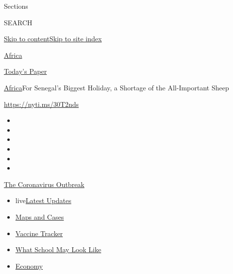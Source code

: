 Sections

SEARCH

\protect\hyperlink{site-content}{Skip to
content}\protect\hyperlink{site-index}{Skip to site index}

\href{https://www.nytimes3xbfgragh.onion/section/world/africa}{Africa}

\href{https://myaccount.nytimes3xbfgragh.onion/auth/login?response_type=cookie\&client_id=vi}{}

\href{https://www.nytimes3xbfgragh.onion/section/todayspaper}{Today's
Paper}

\href{/section/world/africa}{Africa}\textbar{}For Senegal's Biggest
Holiday, a Shortage of the All-Important Sheep

\url{https://nyti.ms/30T2nds}

\begin{itemize}
\item
\item
\item
\item
\item
\item
\end{itemize}

\href{https://www.nytimes3xbfgragh.onion/news-event/coronavirus?action=click\&pgtype=Article\&state=default\&region=TOP_BANNER\&context=storylines_menu}{The
Coronavirus Outbreak}

\begin{itemize}
\tightlist
\item
  live\href{https://www.nytimes3xbfgragh.onion/2020/08/01/world/coronavirus-covid-19.html?action=click\&pgtype=Article\&state=default\&region=TOP_BANNER\&context=storylines_menu}{Latest
  Updates}
\item
  \href{https://www.nytimes3xbfgragh.onion/interactive/2020/us/coronavirus-us-cases.html?action=click\&pgtype=Article\&state=default\&region=TOP_BANNER\&context=storylines_menu}{Maps
  and Cases}
\item
  \href{https://www.nytimes3xbfgragh.onion/interactive/2020/science/coronavirus-vaccine-tracker.html?action=click\&pgtype=Article\&state=default\&region=TOP_BANNER\&context=storylines_menu}{Vaccine
  Tracker}
\item
  \href{https://www.nytimes3xbfgragh.onion/interactive/2020/07/29/us/schools-reopening-coronavirus.html?action=click\&pgtype=Article\&state=default\&region=TOP_BANNER\&context=storylines_menu}{What
  School May Look Like}
\item
  \href{https://www.nytimes3xbfgragh.onion/live/2020/07/31/business/stock-market-today-coronavirus?action=click\&pgtype=Article\&state=default\&region=TOP_BANNER\&context=storylines_menu}{Economy}
\end{itemize}


